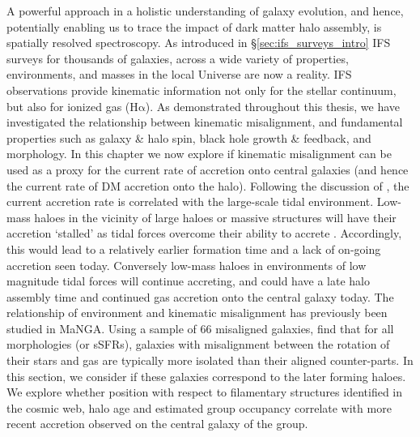 A powerful approach in a holistic understanding of galaxy evolution, and hence, potentially enabling us to trace the impact of dark matter halo assembly, is spatially resolved spectroscopy. As introduced in \S\ref{sec:ifs_surveys_intro} IFS surveys for thousands of galaxies, across a wide variety of properties, environments, and masses in the local Universe are now a reality. 
IFS observations provide kinematic information not only for the stellar continuum, but also for ionized gas ($\mathrm{H\alpha}$). As demonstrated throughout this thesis, we have investigated the relationship between kinematic misalignment, and fundamental properties such as galaxy \& halo spin, black hole growth \& feedback, and morphology. 
In this chapter we now explore if kinematic misalignment can be used as a proxy for the current rate of accretion onto central galaxies (and hence the current rate of DM accretion onto the halo). Following the discussion of \citet{hahn2009}, the current accretion rate is correlated with the large-scale tidal environment. Low-mass haloes in the vicinity of large haloes or massive structures will have their accretion `stalled' as tidal forces overcome their ability to accrete \citep[see also;][]{wang2007,dalal2008,lacerna2011}. Accordingly, this would lead to a relatively earlier formation time and a lack of on-going accretion seen today. Conversely low-mass haloes in environments of low magnitude tidal forces will continue accreting, and could have a late halo assembly time and continued gas accretion onto the central galaxy today. 
The relationship of environment and kinematic misalignment has previously been studied in MaNGA. Using a sample of 66 misaligned galaxies, \citet{jin2016} find that for all morphologies (or sSFRs), galaxies with misalignment between the rotation of their stars and gas are typically more isolated than their aligned counter-parts. In this section, we consider if these galaxies correspond to the later forming haloes. We explore whether position with respect to filamentary structures identified in the cosmic web, halo age and estimated group occupancy correlate with more recent accretion observed on the central galaxy of the group. 

